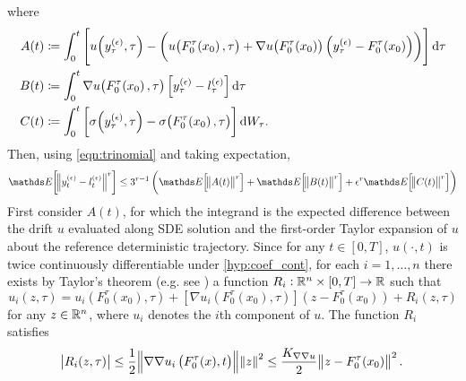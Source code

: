 where
\begin{align*}
	A(t) & \coloneqq \int_0^t{\left[u\!\left(y_\tau^{(\epsilon)}, \tau\right) - \left(u\!\left(F_0^\tau\!\left(x_0\right), \tau\right) + \nabla u\!\left(F_0^\tau\!\left(x_0\right)\right)\left(y_\tau^{(\epsilon)} - F_0^\tau\!\left(x_0\right)\right)\right)\right]\dif\tau} \\
	B(t) & \coloneqq \int_0^t{\nabla u\!\left(F_0^\tau\!\left(x_0\right), \tau\right)\left[y_\tau^{(\epsilon)} - l_\tau^{(\epsilon)}\right]\dif \tau}                                                                                                                          \\
	C(t) & \coloneqq \int_0^t{\left[\sigma\!\left(y_\tau^{(\epsilon)}, \tau\right) - \sigma\!\left(F_0^{\tau}\!\left(x_0\right), \tau\right)\right]\dif W_\tau}.
\end{align*}
Then, using \eqref{eqn:trinomial} and taking expectation,
\begin{equation}
	\avg{\norm{y_t^{(\epsilon)} - l_t^{(\epsilon)}}^r} \leq 3^{r-1}\left(\avg{\norm{A(t)}^r} + \avg{\norm{B(t)}^r} + \epsilon^r\avg{\norm{C(t)}^r}\right)
	\label{eqn:diff_decomp}
\end{equation}
First consider \(A(t)\), for which the integrand is the expected difference between the drift \(u\) evaluated along SDE solution and the first-order Taylor expansion of \(u\) about the reference deterministic trajectory.
Since for any \(t \in [0,T]\), \(u\left(\cdot, t\right)\) is twice continuously differentiable under \ref{hyp:coef_cont}, for each \(i = 1,\hdots,n\) there exists by Taylor's theorem (e.g. see \cite[Cor. A9.3.]{HubbardHubbard_2009_VectorCalculusLinear}) a function \(R_i: \mathbb{R}^n \times [0,T] \to \mathbb{R}\) such that
\begin{equation}
	u_i\!\left(z, \tau\right) = u_i\!\left(F_0^\tau\!\left(x_0\right), \tau\right) + \left[\nabla u_i\left(F_0^\tau\!\left(x_0\right), \tau\right)\right]\left(z - F_0^\tau\!\left(x_0\right)\right) + R_i\!\left(z, \tau\right)
	\label{eqn:taylor_expan}
\end{equation}
for any \(z \in \mathbb{R}^n\), where \(u_i\) denotes the \(i\)th component of \(u\).
The function \(R_i\) satisfies
\begin{equation}
	\abs{R_i(z, \tau)} \leq \frac12\norm{\nabla\nabla u_i\left(F_0^\tau(x), t\right)}\norm{z}^2 \leq \frac{K_{\nabla\nabla u}}{2}\norm{z - F_0^\tau\!\left(x_0\right)}^2.
	\label{eqn:rem_ineq}
\end{equation}
